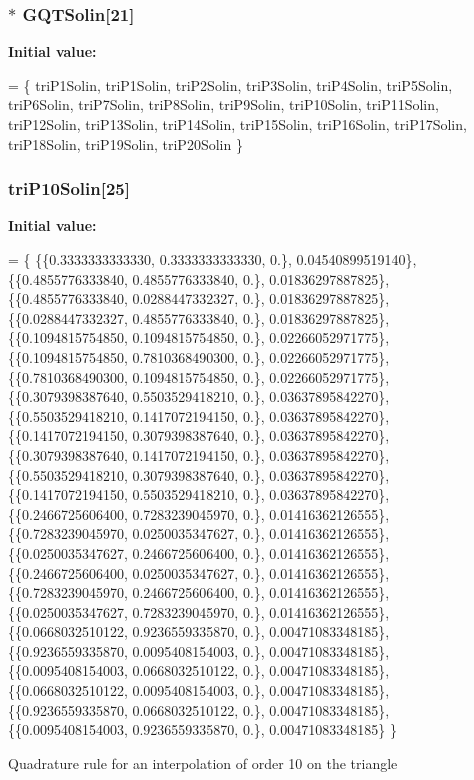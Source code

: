 \subsubsection[{G\-Q\-T\-Solin}]{$\ast$ G\-Q\-T\-Solin[21]}\label{GaussQuadratureTri_8cc_ae885202c123e6a8671ebbc6add7c97f9}
{\bfseries Initial value\-:}
\begin{DoxyCode}
= \{
  triP1Solin,
  triP1Solin,
  triP2Solin,
  triP3Solin,
  triP4Solin,
  triP5Solin,
  triP6Solin,
  triP7Solin,
  triP8Solin,
  triP9Solin,
  triP10Solin,
  triP11Solin,
  triP12Solin,
  triP13Solin,
  triP14Solin,
  triP15Solin,
  triP16Solin,
  triP17Solin,
  triP18Solin,
  triP19Solin,
  triP20Solin
\}
\end{DoxyCode}
\subsubsection[{tri\-P10\-Solin}]{ tri\-P10\-Solin[25]}\label{GaussQuadratureTri_8cc_ad50df357ca6ce18b91ba80adb44ca253}
{\bfseries Initial value\-:}
\begin{DoxyCode}
= \{
  \{\{0.3333333333330, 0.3333333333330, 0.\}, 0.04540899519140\},
  \{\{0.4855776333840, 0.4855776333840, 0.\}, 0.01836297887825\},
  \{\{0.4855776333840, 0.0288447332327, 0.\}, 0.01836297887825\},
  \{\{0.0288447332327, 0.4855776333840, 0.\}, 0.01836297887825\},
  \{\{0.1094815754850, 0.1094815754850, 0.\}, 0.02266052971775\},
  \{\{0.1094815754850, 0.7810368490300, 0.\}, 0.02266052971775\},
  \{\{0.7810368490300, 0.1094815754850, 0.\}, 0.02266052971775\},
  \{\{0.3079398387640, 0.5503529418210, 0.\}, 0.03637895842270\},
  \{\{0.5503529418210, 0.1417072194150, 0.\}, 0.03637895842270\},
  \{\{0.1417072194150, 0.3079398387640, 0.\}, 0.03637895842270\},
  \{\{0.3079398387640, 0.1417072194150, 0.\}, 0.03637895842270\},
  \{\{0.5503529418210, 0.3079398387640, 0.\}, 0.03637895842270\},
  \{\{0.1417072194150, 0.5503529418210, 0.\}, 0.03637895842270\},
  \{\{0.2466725606400, 0.7283239045970, 0.\}, 0.01416362126555\},
  \{\{0.7283239045970, 0.0250035347627, 0.\}, 0.01416362126555\},
  \{\{0.0250035347627, 0.2466725606400, 0.\}, 0.01416362126555\},
  \{\{0.2466725606400, 0.0250035347627, 0.\}, 0.01416362126555\},
  \{\{0.7283239045970, 0.2466725606400, 0.\}, 0.01416362126555\},
  \{\{0.0250035347627, 0.7283239045970, 0.\}, 0.01416362126555\},
  \{\{0.0668032510122, 0.9236559335870, 0.\}, 0.00471083348185\},
  \{\{0.9236559335870, 0.0095408154003, 0.\}, 0.00471083348185\},
  \{\{0.0095408154003, 0.0668032510122, 0.\}, 0.00471083348185\},
  \{\{0.0668032510122, 0.0095408154003, 0.\}, 0.00471083348185\},
  \{\{0.9236559335870, 0.0668032510122, 0.\}, 0.00471083348185\},
  \{\{0.0095408154003, 0.9236559335870, 0.\}, 0.00471083348185\}
\}
\end{DoxyCode}
Quadrature rule for an interpolation of order 10 on the triangle 
